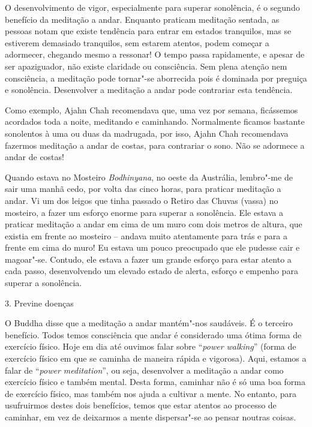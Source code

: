 O desenvolvimento de vigor, especialmente para superar sonolência, é o
segundo benefício da meditação a andar. Enquanto praticam meditação
sentada, as pessoas notam que existe tendência para entrar em estados
tranquilos, mas se estiverem demasiado tranquilos, sem estarem atentos,
podem começar a adormecer, chegando mesmo a ressonar! O tempo passa
rapidamente, e apesar de ser apaziguador, não existe claridade ou
consciência. Sem plena atenção nem consciência, a meditação pode
tornar"-se aborrecida pois é dominada por preguiça e sonolência.
Desenvolver a meditação a andar pode contrariar esta tendência.

Como exemplo, Ajahn Chah recomendava que, uma vez por semana,
ficássemos acordados toda a noite, meditando e caminhando. Normalmente
ficamos bastante sonolentos à uma ou duas da madrugada, por isso,
Ajahn Chah recomendava fazermos meditação a andar de costas, para
contrariar o sono. Não se adormece a andar de costas!

Quando estava no Mosteiro \emph{Bodhinyana}, no oeste da Austrália,
lembro"-me de sair uma manhã cedo, por volta das cinco horas, para
praticar meditação a andar. Vi um dos leigos que tinha passado o Retiro
das Chuvas (vassa) no mosteiro, a fazer um esforço enorme para superar a
sonolência. Ele estava a praticar meditação a andar em cima de um muro
com dois metros de altura, que existia em frente ao mosteiro -- andava
muito atentamente para trás e para a frente em cima do muro! Eu estava
um pouco preocupado que ele pudesse cair e magoar"-se. Contudo, ele
estava a fazer um grande esforço para estar atento a cada passo,
desenvolvendo um elevado estado de alerta, esforço e empenho para
superar a sonolência.

\begin{siderule-quote}
  3. Previne doenças
\end{siderule-quote}

O Buddha disse que a meditação a andar mantém"-nos saudáveis. É o
terceiro benefício. Todos temos consciência que andar é considerado uma
ótima forma de exercício físico. Hoje em dia até ouvimos falar sobre
``\emph{power walking}'' (forma de exercício físico em que se caminha de
maneira rápida e vigorosa). Aqui, estamos a falar de ``\emph{power
meditation}'', ou seja, desenvolver a meditação a andar como exercício
físico e também mental. Desta forma, caminhar não é só uma boa forma de
exercício físico, mas também nos ajuda a cultivar a mente. No entanto,
para usufruirmos destes dois benefícios, temos que estar atentos ao
processo de caminhar, em vez de deixarmos a mente dispersar"-se ao pensar
noutras coisas.

